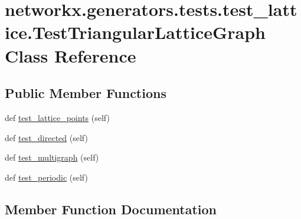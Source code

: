 \hypertarget{classnetworkx_1_1generators_1_1tests_1_1test__lattice_1_1TestTriangularLatticeGraph}{}\section{networkx.\+generators.\+tests.\+test\+\_\+lattice.\+Test\+Triangular\+Lattice\+Graph Class Reference}
\label{classnetworkx_1_1generators_1_1tests_1_1test__lattice_1_1TestTriangularLatticeGraph}
\subsection*{Public Member Functions}
\begin{DoxyCompactItemize}
\item 
def \hyperlink{classnetworkx_1_1generators_1_1tests_1_1test__lattice_1_1TestTriangularLatticeGraph_a5e141667e16e3468620c5fba6eab1507}{test\+\_\+lattice\+\_\+points} (self)
\item 
def \hyperlink{classnetworkx_1_1generators_1_1tests_1_1test__lattice_1_1TestTriangularLatticeGraph_a3c3a3f30d7286b25d66901a3344f2655}{test\+\_\+directed} (self)
\item 
def \hyperlink{classnetworkx_1_1generators_1_1tests_1_1test__lattice_1_1TestTriangularLatticeGraph_a20488837b10927a5c9d33aa7a3576eb5}{test\+\_\+multigraph} (self)
\item 
def \hyperlink{classnetworkx_1_1generators_1_1tests_1_1test__lattice_1_1TestTriangularLatticeGraph_aca6f13c26db22e6f2d7349d2d55a63e7}{test\+\_\+periodic} (self)
\end{DoxyCompactItemize}


\subsection{Member Function Documentation}
\mbox{\label{classnetworkx_1_1generators_1_1tests_1_1test__lattice_1_1TestTriangularLatticeGraph_a3c3a3f30d7286b25d66901a3344f2655}} 
